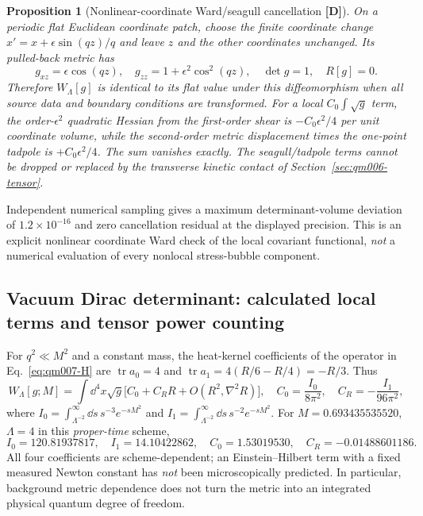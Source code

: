 \documentclass[11pt,a4paper]{article}
\newtheorem{proposition}{Proposition}[section]\newtheorem{lemma}[proposition]{Lemma}\newtheorem{definition}[proposition]{Definition}\newtheorem{remark}[proposition]{Remark}
\begin{document}
\begin{proposition}[Nonlinear-coordinate Ward/seagull cancellation \textbf{[D]}]\label{prop:qm007-ward-shear}
On a periodic flat Euclidean coordinate patch, choose the finite coordinate change $x'=x+\epsilon\sin(qz)/q$ and leave $z$ and the other coordinates unchanged. Its pulled-back metric has
\begin{equation}\label{eq:qm007-pullback}
 g_{xz}=\epsilon\cos(qz),\quad g_{zz}=1+\epsilon^2\cos^2(qz),\quad
 \det g=1,\quad R[g]=0.
\end{equation}
Therefore $W_\Lambda[g]$ is identical to its flat value under this diffeomorphism when all source data and boundary conditions are transformed. For a local $C_0\int\sqrt g$ term, the order-$\epsilon^2$ quadratic Hessian from the first-order shear is $-C_0\epsilon^2/4$ per unit coordinate volume, while the second-order metric displacement times the one-point tadpole is $+C_0\epsilon^2/4$. The sum vanishes exactly. The seagull/tadpole terms cannot be dropped or replaced by the transverse kinetic contact of Section~\ref{sec:qm006-tensor}.
\end{proposition}
\noindent Independent numerical sampling gives a maximum determinant-volume deviation of $1.2\times10^{-16}$ and zero cancellation residual at the displayed precision. This is an explicit nonlinear coordinate Ward check of the local covariant functional, \emph{not} a numerical evaluation of every nonlocal stress-bubble component.

\subsection{Vacuum Dirac determinant: calculated local terms and tensor power counting}
For $q^2\ll M^2$ and a constant mass, the heat-kernel coefficients of the operator in Eq.~\eqref{eq:qm007-H} are $\operatorname{tr}a_0=4$ and $\operatorname{tr}a_1=4(R/6-R/4)=-R/3$. Thus
\begin{equation}\label{eq:qm007-vac}
\boxed{W_\Lambda[g;M]=\int\dd^4x\sqrt g\big[C_0+C_RR+O(R^2,\nabla^2R)\big],\quad
 C_0=\frac{I_0}{8\pi^2},\quad C_R=-\frac{I_1}{96\pi^2},}
\end{equation}
where $I_0=\int_{\Lambda^{-2}}^\infty\dd s\,s^{-3}e^{-sM^2}$ and $I_1=\int_{\Lambda^{-2}}^\infty\dd s\,s^{-2}e^{-sM^2}$. For $M=0.693435535520$, $\Lambda=4$ in this \emph{proper-time} scheme,
\begin{equation}\label{eq:qm007-vacnumbers}
\boxed{I_0=120.81937817,\quad I_1=14.10422862,\quad C_0=1.53019530,\quad C_R=-0.01488601186.}
\end{equation}
All four coefficients are scheme-dependent; an Einstein--Hilbert term with a fixed measured Newton constant has \emph{not} been microscopically predicted. In particular, background metric dependence does not turn the metric into an integrated physical quantum degree of freedom.
\end{document}
